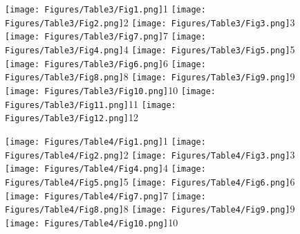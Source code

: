 \documentclass[a4paper, 11pt, oneside]{article}
\begin{document}
\begin{figure}[p]
\texttt{[image: Figures/Table3/Fig1.png]}\tiny 1
\texttt{[image: Figures/Table3/Fig2.png]}\tiny 2
\texttt{[image: Figures/Table3/Fig3.png]}\tiny 3
\texttt{[image: Figures/Table3/Fig7.png]}\tiny 7
\texttt{[image: Figures/Table3/Fig4.png]}\tiny 4
\texttt{[image: Figures/Table3/Fig5.png]}\tiny 5
\texttt{[image: Figures/Table3/Fig6.png]}\tiny 6
\texttt{[image: Figures/Table3/Fig8.png]}\tiny 8
\texttt{[image: Figures/Table3/Fig9.png]}\tiny 9
\texttt{[image: Figures/Table3/Fig10.png]}\tiny 10
\texttt{[image: Figures/Table3/Fig11.png]}\tiny 11
\texttt{[image: Figures/Table3/Fig12.png]}\tiny 12
\end{figure}
\clearpage
{}
\cfoot{\thepage}
\begin{figure}[p]
\texttt{[image: Figures/Table4/Fig1.png]}\tiny 1
\texttt{[image: Figures/Table4/Fig2.png]}\tiny 2
\texttt{[image: Figures/Table4/Fig3.png]}\tiny 3
\texttt{[image: Figures/Table4/Fig4.png]}\tiny 4
\texttt{[image: Figures/Table4/Fig5.png]}\tiny 5
\texttt{[image: Figures/Table4/Fig6.png]}\tiny 6
\texttt{[image: Figures/Table4/Fig7.png]}\tiny 7
\texttt{[image: Figures/Table4/Fig8.png]}\tiny 8
\texttt{[image: Figures/Table4/Fig9.png]}\tiny 9
\texttt{[image: Figures/Table4/Fig10.png]}\tiny 10
\end{figure}
\clearpage
\end{document}
